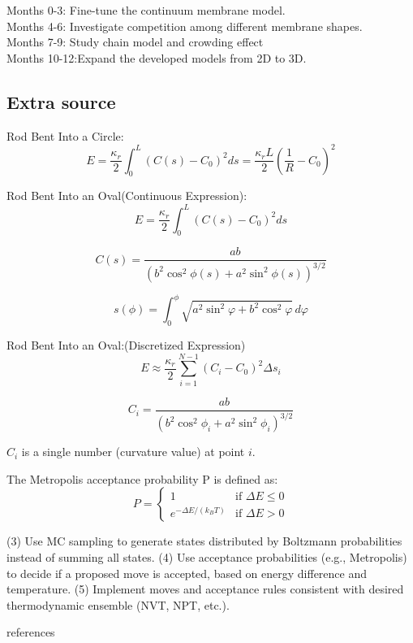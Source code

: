 \documentclass[12pt]{article}
\begin{document}
\begin{flushleft}
Months 0-3: Fine-tune the continuum membrane model.\\
Months 4-6: Investigate competition among different membrane shapes.\\
Months 7-9: Study chain model and crowding effect\\
Months 10-12:Expand the developed models from 2D to 3D.\\


\newpage

\subsection*{Extra source}
Rod Bent Into a Circle:
\begin{equation}
E = \frac{\kappa_r}{2} \int_0^L \left(C(s) - C_0 \right)^2 ds = \frac{\kappa_r L}{2} \left(\frac{1}{R} - C_0 \right)^2
\end{equation}

Rod Bent Into an Oval(Continuous Expression):
\begin{equation}
E = \frac{\kappa_r}{2} \int_0^L \left( C(s) - C_0 \right)^2 ds
\end{equation}


\begin{equation}
C(s) = \frac{ab}{\left(b^2 \cos^2 \phi(s) + a^2 \sin^2 \phi(s) \right)^{3/2}}
\end{equation}

\begin{equation}
s(\phi) = \int_0^\phi \sqrt{a^2 \sin^2 \varphi + b^2 \cos^2 \varphi} \, d\varphi
\end{equation}



Rod Bent Into an Oval:(Discretized Expression)
\begin{equation}
E \approx \frac{\kappa_r}{2} \sum_{i=1}^{N-1} (C_i - C_0)^2 \Delta s_i
\end{equation}

\begin{equation}
C_i = \frac{a b}{\left( b^2 \cos^2 \phi_i + a^2 \sin^2 \phi_i \right)^{3/2}}
\end{equation}

$C_i$ is a single number (curvature value) at point $i$.

The Metropolis acceptance probability P is defined as:
\begin{equation}
P = \begin{cases}
1 & \text{if } \Delta E \leq 0 \\
e^{-\Delta E / (k_B T)} & \text{if } \Delta E > 0
\end{cases}
\end{equation}

\newpage



(3)  Use MC sampling to generate states distributed by Boltzmann probabilities instead of summing all states.
(4)	Use acceptance probabilities (e.g., Metropolis) to decide if a proposed move is accepted, based on energy difference and temperature.
(5)	Implement moves and acceptance rules consistent with desired thermodynamic ensemble (NVT, NPT, etc.).



\end{flushleft}

 {references}  
\end{document}
